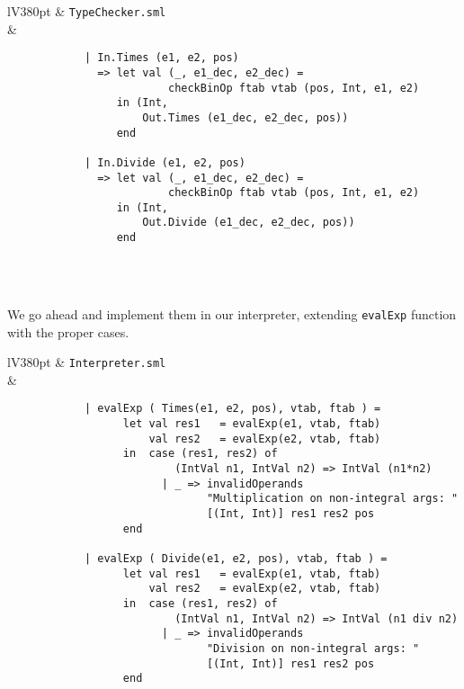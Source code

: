 \documentclass[a4paper]{article}
\begin{document}
\begin{center}	
	\begin{tabular}{lV{380pt}}
		\toprule
		& \verb|TypeChecker.sml|\\
		\midrule
		&
		\begin{verbatim}
		    | In.Times (e1, e2, pos)
		      => let val (_, e1_dec, e2_dec) =
			             checkBinOp ftab vtab (pos, Int, e1, e2)
		         in (Int,
		             Out.Times (e1_dec, e2_dec, pos))
		         end
		 
		    | In.Divide (e1, e2, pos)
		      => let val (_, e1_dec, e2_dec) =
		                 checkBinOp ftab vtab (pos, Int, e1, e2)
		         in (Int,
		             Out.Divide (e1_dec, e2_dec, pos))
		         end		
		\end{verbatim}
		\\
		\bottomrule \\
	\end{tabular}
\end{center}

We go ahead and implement them in our interpreter, extending \verb|evalExp| function with the proper cases.

\begin{center}	
	\begin{tabular}{lV{380pt}}
		\toprule
		& \verb|Interpreter.sml|\\
		\midrule
		&
		\begin{verbatim}
			| evalExp ( Times(e1, e2, pos), vtab, ftab ) =
			      let val res1   = evalExp(e1, vtab, ftab)
			          val res2   = evalExp(e2, vtab, ftab)
			      in  case (res1, res2) of
			              (IntVal n1, IntVal n2) => IntVal (n1*n2)
			            | _ => invalidOperands
			                   "Multiplication on non-integral args: " 
			                   [(Int, Int)] res1 res2 pos
			      end
			  
			| evalExp ( Divide(e1, e2, pos), vtab, ftab ) =
			      let val res1   = evalExp(e1, vtab, ftab)
			          val res2   = evalExp(e2, vtab, ftab)
			      in  case (res1, res2) of
			              (IntVal n1, IntVal n2) => IntVal (n1 div n2)
			            | _ => invalidOperands
			                   "Division on non-integral args: " 
			                   [(Int, Int)] res1 res2 pos
			      end
		\end{verbatim}
		\\
		\bottomrule \\
	\end{tabular}
\end{center}
\end{document}
